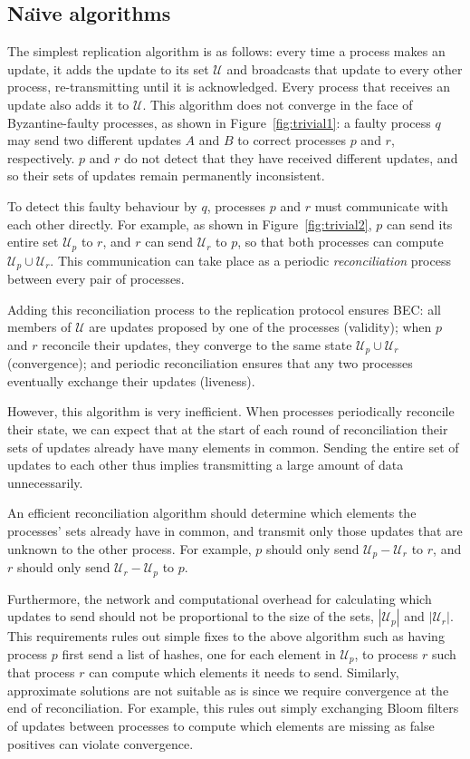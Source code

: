 \documentclass[a4paper,anonymous,USenglish]{lipics-v2019}
\begin{document}
\subsection{Na\"{\i}ve algorithms}

The simplest replication algorithm is as follows: every time a process makes an update, it adds the update to its set $\mathcal{U}$ and broadcasts that update to every other process, re-transmitting until it is acknowledged.
Every process that receives an update also adds it to $\mathcal{U}$.
This algorithm does not converge in the face of Byzantine-faulty processes, as shown in Figure~\ref{fig:trivial1}: a faulty process $q$ may send two different updates $A$ and $B$ to correct processes $p$ and $r$, respectively.
$p$ and $r$ do not detect that they have received different updates, and so their sets of updates remain permanently inconsistent.

To detect this faulty behaviour by $q$, processes $p$ and $r$ must communicate with each other directly.
For example, as shown in Figure~\ref{fig:trivial2}, $p$ can send its entire set $\mathcal{U}_p$ to $r$, and $r$ can send $\mathcal{U}_r$ to $p$, so that both processes can compute $\mathcal{U}_p \cup \mathcal{U}_r$.
This communication can take place as a periodic \emph{reconciliation} process between every pair of processes.

Adding this reconciliation process to the replication protocol ensures BEC: all members of $\mathcal{U}$ are updates proposed by one of the processes (validity); when $p$ and $r$ reconcile their updates, they converge to the same state $\mathcal{U}_p \cup \mathcal{U}_r$ (convergence); and periodic reconciliation ensures that any two processes eventually exchange their updates (liveness).

However, this algorithm is very inefficient.
When processes periodically reconcile their state, we can expect that at the start of each round of reconciliation their sets of updates already have many elements in common.
Sending the entire set of updates to each other thus implies transmitting a large amount of data unnecessarily.

An efficient reconciliation algorithm should determine which elements the processes' sets already have in common, and transmit only those updates that are unknown to the other process.
For example, $p$ should only send $\mathcal{U}_p - \mathcal{U}_r$ to $r$, and $r$ should only send $\mathcal{U}_r - \mathcal{U}_p$ to $p$.

Furthermore, the network and computational overhead for calculating which updates to send should not be proportional to the size of the sets, $|\mathcal{U}_p|$ and $|\mathcal{U}_r|$.
This requirements rules out simple fixes to the above algorithm such as having process $p$ first send a list of hashes, one for each element in $\mathcal{U}_p$, to process $r$ such that process $r$ can compute which elements it needs to send.
Similarly, approximate solutions are not suitable as is since we require convergence at the end of reconciliation.
For example, this rules out simply exchanging Bloom filters of updates between processes to compute which elements are missing as false positives can violate convergence.
\end{document}
